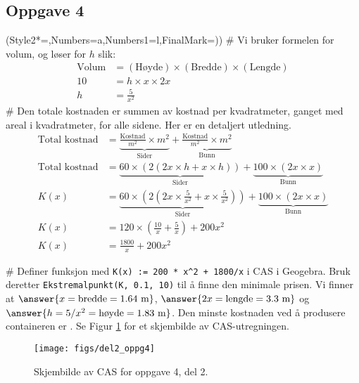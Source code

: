 \subsection*{Oppgave 4}
\begin{easylist}[enumerate]
	\ListProperties(Style2*=,Numbers=a,Numbers1=l,FinalMark={)})
	# Vi bruker formelen for volum, og løser for $h$ slik:
	\begin{align*}
		\text{Volum} &= (\text{Høyde}) \times (\text{Bredde}) \times (\text{Lengde}) \\
		10 &= h  \times x \times 2x \\
		h &= \frac{5}{x^2}
	\end{align*}
	# Den totale kostnaden er summen av kostnad per kvadratmeter, ganget med areal i kvadratmeter, for alle sidene. Her er en detaljert utledning.
	\begin{align*}
		\text{Total kostnad} &=  
		\underbrace{\frac{\text{Kostnad}}{m^2} \times m^2}_{\text{Sider}} + 
		\underbrace{\frac{\text{Kostnad}}{m^2} \times m^2}_{\text{Bunn}}
		\\
		\text{Total kostnad} &=  
		\underbrace{60 \times \left( 2(2x \times h + x \times h) \right)}_{\text{Sider}} + 
		\underbrace{100 \times \left( 2x \times x \right)}_{\text{Bunn}}
		\\
		K(x) &=  
		\underbrace{60 \times \left( 2\left(2x \times \frac{5}{x^2} + x \times \frac{5}{x^2}\right) \right)}_{\text{Sider}} + 
		\underbrace{100 \times \left( 2x \times x \right)}_{\text{Bunn}}
		\\
		K(x) &=  
		120 \times \left(  \frac{10}{x} +\frac{5}{x} \right) + 
		200x^2
		\\
		K(x) &=  \frac{1800}{x} + 
		200x^2
	\end{align*}
	
	# Definer funksjon med \verb|K(x) := 200 * x^2 + 1800/x| i CAS i Geogebra.
	Bruk deretter \verb|Ekstremalpunkt(K, 0.1, 10)| til å finne den minimale prisen. 
	Vi finner at $\answer{x = \text{bredde} = 1.64 \text{ m}}$, 
	$\answer{2x = \text{lengde} = 3.3 \text{ m}}$ og
	 $\answer{h = 5/x^2 = \text{høyde} = 1.83 \text{ m}}$.
	 Den minste kostnaden ved å produsere containeren er
	 . Se Figur \ref{fig:del2_oppg4} for et skjembilde
	 av CAS-utregningen.
	
\begin{figure}[ht!]
\centering
\texttt{[image: figs/del2\_oppg4]}
\caption{Skjembilde av CAS for oppgave 4, del 2.}
\label{fig:del2_oppg4}
\end{figure}
\end{easylist}


